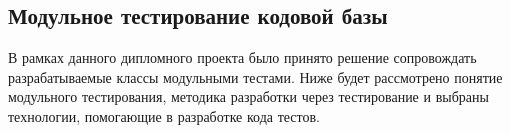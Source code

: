 \subsection{Модульное тестирование кодовой базы}
\label{sec:testing:unit}

В рамках данного дипломного проекта было принято решение сопровождать разрабатываемые классы модульными тестами. Ниже будет рассмотрено понятие модульного тестирования, методика разработки через тестирование и выбраны технологии, помогающие в разработке кода тестов.



